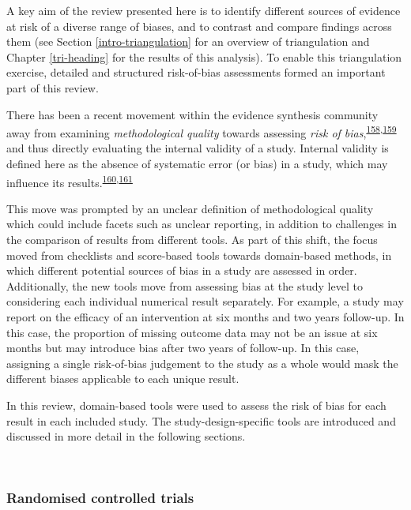 \documentclass[a4paper, twoside]{templates/ociamthesis}
\begin{document}
A key aim of the review presented here is to identify different sources of evidence at risk of a diverse range of biases, and to contrast and compare findings across them (see Section \ref{intro-triangulation} for an overview of triangulation and Chapter \ref{tri-heading} for the results of this analysis). To enable this triangulation exercise, detailed and structured risk-of-bias assessments formed an important part of this review.

There has been a recent movement within the evidence synthesis community away from examining \emph{methodological quality} towards assessing \emph{risk of bias},\textsuperscript{\protect\hyperlink{ref-mcguinness2018}{158},\protect\hyperlink{ref-sterne2016}{159}} and thus directly evaluating the internal validity of a study. Internal validity is defined here as the absence of systematic error (or bias) in a study, which may influence its results.\textsuperscript{\protect\hyperlink{ref-campbell1957}{160},\protect\hyperlink{ref-juni2001}{161}}

This move was prompted by an unclear definition of methodological quality which could include facets such as unclear reporting, in addition to challenges in the comparison of results from different tools. As part of this shift, the focus moved from checklists and score-based tools towards domain-based methods, in which different potential sources of bias in a study are assessed in order. Additionally, the new tools move from assessing bias at the study level to considering each individual numerical result separately. For example, a study may report on the efficacy of an intervention at six months and two years follow-up. In this case, the proportion of missing outcome data may not be an issue at six months but may introduce bias after two years of follow-up. In this case, assigning a single risk-of-bias judgement to the study as a whole would mask the different biases applicable to each unique result.

In this review, domain-based tools were used to assess the risk of bias for each result in each included study. The study-design-specific tools are introduced and discussed in more detail in the following sections.

~

\hypertarget{randomised-controlled-trials-1}{%
\subsubsection{Randomised controlled trials}\label{randomised-controlled-trials-1}}
\end{document}
